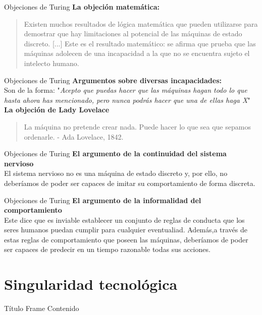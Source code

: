 \documentclass{beamer}
\begin{document}
\begin{frame}{Objeciones de Turing}
\textbf{La objeción matemática:}
\begin{quote}\small Existen muchos resultados de lógica matemática que pueden utilizarse para demostrar que hay limitaciones al potencial de las máquinas de estado discreto. [...] Este es el resultado matemático: se afirma que prueba que las máquinas adolecen de una incapacidad a la que no se encuentra sujeto el intelecto humano.\end{quote}
\end{frame}

\begin{frame}{Objeciones de Turing}
\textbf{Argumentos sobre diversas incapacidades:}\\
Son de la forma: "\emph{Acepto que puedas hacer que las máquinas hagan todo lo que hasta ahora has mencionado, pero nunca podrás hacer que una de ellas haga X}"\\
\vspace{8mm}
\textbf{La objeción de Lady Lovelace}
\begin{quote}\small La máquina no pretende crear nada. Puede hacer lo que sea que sepamos ordenarle. - Ada Lovelace, 1842.\end{quote}
\end{frame}

\begin{frame}{Objeciones de Turing}
\textbf{El argumento de la continuidad del sistema nervioso}\\
El sistema nervioso no es una máquina de estado discreto y, por ello, no deberíamos de poder ser capaces de imitar su comportamiento de forma discreta.

\end{frame}

\begin{frame}{Objeciones de Turing}
\textbf{El argumento de la informalidad del comportamiento}\\
Este dice que es inviable establecer un conjunto de reglas de conducta que los seres humanos puedan cumplir para cualquier eventualiad. Además,a través de estas reglas de comportamiento que poseen las máquinas, deberíamos de poder ser capaces de predecir en un tiempo razonable todas sus acciones.
\end{frame}

\section{Singularidad tecnológica}
\begin{frame}{Título Frame}
Contenido
\end{frame}
\end{document}
